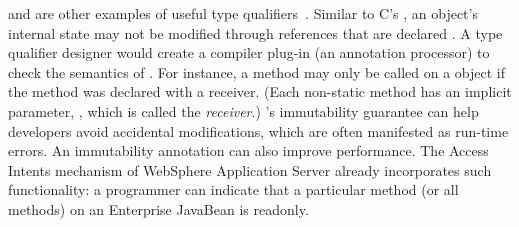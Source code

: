 \documentclass[10pt]{article}
\begin{document}



 and  are other examples of useful type
qualifiers~\cite{ZibinPAKE2007,BirkaE2004,TschantzE2005,GreenfieldboyceF2005,KnieselT2001,SkoglundW2001,PoratBKM2000}.
Similar to C's , an object's internal state may not be modified
through references that are declared . A type qualifier
designer would create a compiler plug-in (an annotation processor) to check
the semantics of .  For instance, a method may only be
called on a  object if the method was declared with a
 receiver.
(Each non-static method has an implicit parameter, , which is
called the \emph{receiver}.)
's immutability guarantee can
help developers avoid accidental modifications, which are often manifested
as run-time errors.
An immutability annotation can also improve performance.
The Access Intents mechanism of WebSphere Application Server already
incorporates such functionality:
a programmer can indicate that a particular method (or all methods) on
an Enterprise JavaBean is readonly.
\end{document}
